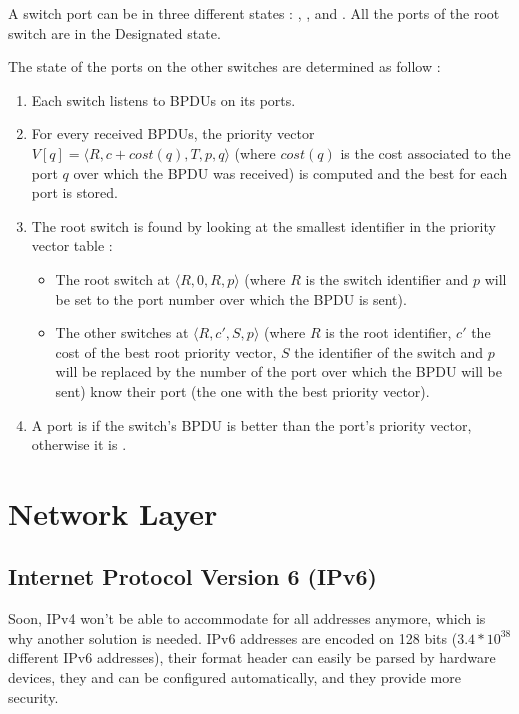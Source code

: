 A switch port can be in three different states : , , and . All the ports of the root switch are in the Designated state.

The state of the ports on the other switches are determined as follow :
\begin{enumerate}
\item Each switch listens to BPDUs on its ports.
\item For every received BPDUs, the priority vector $V[q] = \langle R, c + cost(q), T, p, q \rangle$ (where $cost(q)$ is the cost associated to the port $q$ over which the BPDU was received) is computed and the best for each port is stored.
\item The root switch is found by looking at the smallest identifier in the priority vector table :
	\begin{itemize}
	\item The root switch at $\langle R, 0, R, p \rangle$ (where $R$ is the switch identifier and $p$ will be set to the port number over which the BPDU is sent).
	\item The other switches at $\langle R, c', S, p \rangle$ (where $R$ is the root identifier, $c'$ the cost of the best root priority vector, $S$ the identifier of the switch and $p$ will be replaced by the number of the port over which the BPDU will be sent) know their  port (the one with the best priority vector).
	\end{itemize}
\item A port is  if the switch's BPDU is better than the port’s priority vector, otherwise it is .
\end{enumerate}

\section{Network Layer}

\subsection[IPv6]{Internet Protocol Version 6 (IPv6)}

Soon, IPv4 won't be able to accommodate for all addresses anymore, which is why another solution is needed.
IPv6 addresses are encoded on 128 bits ($3.4*10^{38}$ different IPv6 addresses), their format header can easily be parsed by hardware devices, they and can be configured automatically, and they provide more security.

